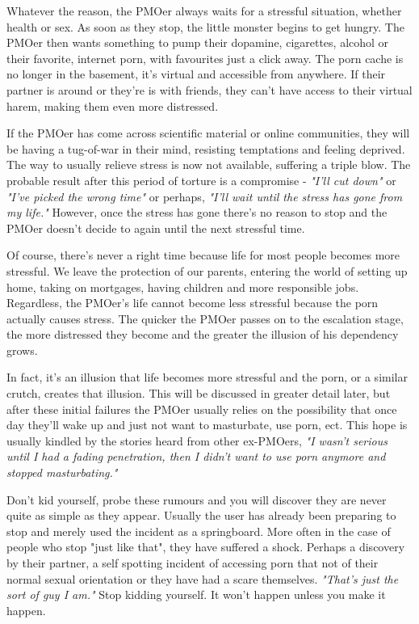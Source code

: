 \documentclass[easypeasy.tex]{subfiles}
\begin{document}
Whatever the reason, the PMOer always waits for a stressful situation, whether health or sex. As soon as they stop, the little monster begins to get hungry. The PMOer then wants something to pump their dopamine, cigarettes, alcohol or their favorite, internet porn, with favourites just a click away. The porn cache is no longer in the basement, it's virtual and accessible from anywhere. If their partner is around or they're is with friends, they can't have access to their virtual harem, making them even more distressed.

If the PMOer has come across scientific material or online communities, they will be having a tug-of-war in their mind, resisting temptations and feeling deprived. The way to usually relieve stress is now not available, suffering a triple blow. The probable result after this period of torture is a compromise - \textit{"I'll cut down"} or \textit{"I've picked the wrong time"} or perhaps, \textit{"I'll wait until the stress has gone from my life."} However, once the stress has gone there's no reason to stop and the PMOer doesn't decide to again until the next stressful time.

Of course, there's never a right time because life for most people becomes more stressful. We leave the protection of our parents, entering the world of setting up home, taking on mortgages, having children and more responsible jobs. Regardless, the PMOer's life cannot become less stressful because the porn actually causes stress. The quicker the PMOer passes on to the escalation stage, the more distressed they become and the greater the illusion of his dependency grows.

In fact, it's an illusion that life becomes more stressful and the porn, or a similar crutch, creates that illusion. This will be discussed in greater detail later, but after these initial failures the PMOer usually relies on the possibility that once day they'll wake up and just not want to masturbate, use porn, ect. This hope is usually kindled by the stories heard from other ex-PMOers, \textit{"I wasn't serious until I had a fading penetration, then I didn't want to use porn anymore and stopped masturbating."}

Don't kid yourself, probe these rumours and you will discover they are never quite as simple as they appear. Usually the user has already been preparing to stop and merely used the incident as a springboard. More often in the case of people who stop "just like that", they have suffered a shock. Perhaps a discovery by their partner, a self spotting incident of accessing porn that not of their normal sexual orientation or they have had a scare themselves. \textit{"That's just the sort of guy I am."} Stop kidding yourself. It won't happen unless you make it happen.
\end{document}
